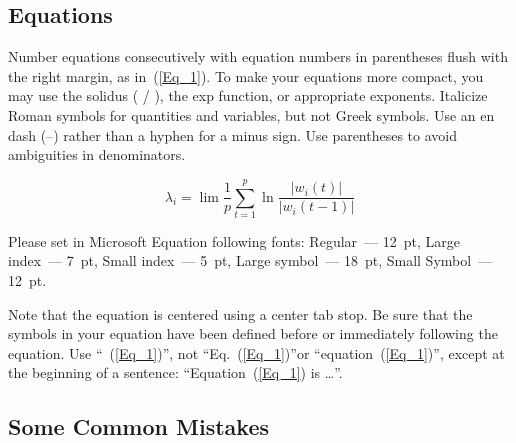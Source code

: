 \documentclass [a4paper,final,conference,10pt]{IDAACS}
\begin{document}
\subsection{Equations}

Number equations consecutively with equation numbers in parentheses flush 
with the right margin, as in~(\ref{Eq_1}). To make your equations more compact,
you may use the solidus ( / ), the exp function, or appropriate exponents. 
Italicize Roman symbols for quantities and variables, but not Greek symbols.
Use an en dash (--) rather than a hyphen for a minus sign. Use parentheses to
avoid ambiguities in denominators. 

\begin{equation}
\label{Eq_1}
\lambda_i = \lim \frac{1}{p} \sum_{t=1}^p \ln \frac{|w_i (t)|}{|w_i (t-1)|}
\end{equation}

Please set in Microsoft Equation following fonts: Regular~--- 12~pt, Large 
index~--- 7~pt, Small index~--- 5~pt, Large symbol~--- 18~pt, Small 
Symbol~--- 12~pt.

Note that the equation is centered using a center tab stop. Be sure that the
symbols in your equation have been defined before or immediately following 
the equation. Use ``~(\ref{Eq_1})'', not ``Eq.~(\ref{Eq_1})''or 
``equation~(\ref{Eq_1})'', except at the beginning of a sentence: 
``Equation~(\ref{Eq_1}) is \ldots{}''.

\subsection{Some Common Mistakes}
\end{document}

